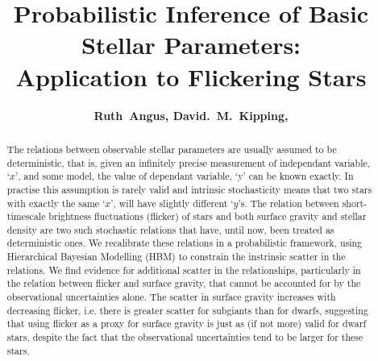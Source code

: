 \documentclass[apjl]{emulateapj}
\newcommand{\titledag}{$\dagger$}
\newcommand{\titledag}{\dagger}
\begin{document}
\title {Probabilistic Inference of Basic Stellar Parameters:\\
Application to Flickering Stars %
\altaffilmark{\titledag}}

\author{
	{\bf	Ruth~Angus,
		David.~M.~Kipping,
	}
}







\begin{abstract}

The relations between observable stellar parameters are usually assumed to be
deterministic, that is, given an infinitely precise measurement of independant
variable, `$x$', and some model, the value of dependant variable, `y' can be
known exactly.
In practise this assumption is rarely valid and intrinsic stochasticity means
that two stars with exactly the same `$x$', will have slightly different
`$y$'s.
The relation between short-timescale brightness fluctuations (flicker) of
stars and both surface gravity \citep{bastien:2013} and stellar density
\citep{kipping:2014} are two such stochastic relations that have, until now,
been treated as deterministic ones.
We recalibrate these relations in a probabilistic framework, using
Hierarchical Bayesian Modelling (HBM) to constrain the instrinsic scatter in
the relations.
We find evidence for additional scatter in the relationships, particularly in
the relation between flicker and surface gravity, that cannot be accounted for
by the observational uncertainties alone.
The scatter in surface gravity increases with decreasing flicker, i.e. there
is greater scatter for subgiants than for dwarfs, suggesting that using flicker
as a proxy for surface gravity is just as (if not more) valid for dwarf stars,
despite the fact that the observational uncertainties tend to be larger for
these stars.

\end{abstract}
\end{document}
